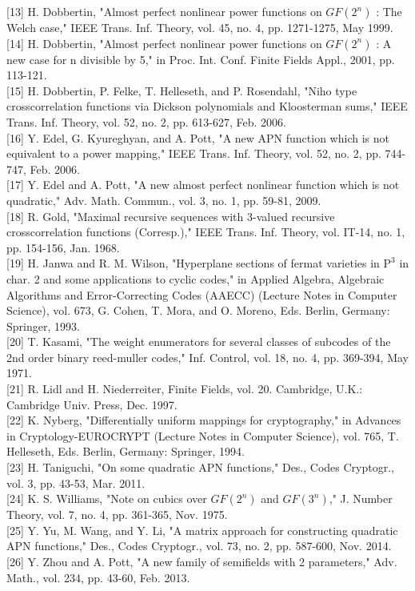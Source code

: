 \documentclass[10pt]{article}
\begin{document}
[13] H. Dobbertin, "Almost perfect nonlinear power functions on $G F\left(2^{n}\right)$ : The Welch case," IEEE Trans. Inf. Theory, vol. 45, no. 4, pp. 1271-1275, May 1999.\\[0pt]
[14] H. Dobbertin, "Almost perfect nonlinear power functions on $G F\left(2^{n}\right)$ : A new case for n divisible by 5," in Proc. Int. Conf. Finite Fields Appl., 2001, pp. 113-121.\\[0pt]
[15] H. Dobbertin, P. Felke, T. Helleseth, and P. Rosendahl, "Niho type crosscorrelation functions via Dickson polynomials and Kloosterman sums," IEEE Trans. Inf. Theory, vol. 52, no. 2, pp. 613-627, Feb. 2006.\\[0pt]
[16] Y. Edel, G. Kyureghyan, and A. Pott, "A new APN function which is not equivalent to a power mapping," IEEE Trans. Inf. Theory, vol. 52, no. 2, pp. 744-747, Feb. 2006.\\[0pt]
[17] Y. Edel and A. Pott, "A new almost perfect nonlinear function which is not quadratic," Adv. Math. Commun., vol. 3, no. 1, pp. 59-81, 2009.\\[0pt]
[18] R. Gold, "Maximal recursive sequences with 3-valued recursive crosscorrelation functions (Corresp.)," IEEE Trans. Inf. Theory, vol. IT-14, no. 1, pp. 154-156, Jan. 1968.\\[0pt]
[19] H. Janwa and R. M. Wilson, "Hyperplane sections of fermat varieties in $\mathrm{P}^{3}$ in char. 2 and some applications to cyclic codes," in Applied Algebra, Algebraic Algorithms and Error-Correcting Codes (AAECC) (Lecture Notes in Computer Science), vol. 673, G. Cohen, T. Mora, and O. Moreno, Eds. Berlin, Germany: Springer, 1993.\\[0pt]
[20] T. Kasami, "The weight enumerators for several classes of subcodes of the 2nd order binary reed-muller codes," Inf. Control, vol. 18, no. 4, pp. 369-394, May 1971.\\[0pt]
[21] R. Lidl and H. Niederreiter, Finite Fields, vol. 20. Cambridge, U.K.: Cambridge Univ. Press, Dec. 1997.\\[0pt]
[22] K. Nyberg, "Differentially uniform mappings for cryptography," in Advances in Cryptology-EUROCRYPT (Lecture Notes in Computer Science), vol. 765, T. Helleseth, Eds. Berlin, Germany: Springer, 1994.\\[0pt]
[23] H. Taniguchi, "On some quadratic APN functions," Des., Codes Cryptogr., vol. 3, pp. 43-53, Mar. 2011.\\[0pt]
[24] K. S. Williams, "Note on cubics over $G F\left(2^{n}\right)$ and $G F\left(3^{n}\right)$," J. Number Theory, vol. 7, no. 4, pp. 361-365, Nov. 1975.\\[0pt]
[25] Y. Yu, M. Wang, and Y. Li, "A matrix approach for constructing quadratic APN functions," Des., Codes Cryptogr., vol. 73, no. 2, pp. 587-600, Nov. 2014.\\[0pt]
[26] Y. Zhou and A. Pott, "A new family of semifields with 2 parameters," Adv. Math., vol. 234, pp. 43-60, Feb. 2013.
\end{document}
